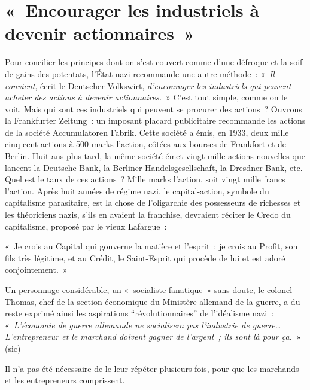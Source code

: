 \documentclass[french,twoside]{book} %
\newenvironment{quoteblock}%
  {\begin{quoting}}
  {\end{quoting}}
\newenvironment{quotebar}{%
    \def\FrameCommand{{\color{rubric!10!}\vrule width 0.5em} \hspace{0.9em}}%
    \def\OuterFrameSep{\itemsep} %
    \MakeFramed {\advance\hsize-\width \FrameRestore}
  }%
  {%
    \endMakeFramed
  }
\renewenvironment{quoteblock}%
  {%
    \savenotes
    \setstretch{0.9}
    \normalfont
    \begin{quotebar}
  }
  {%
    \end{quotebar}
    \spewnotes
  }
\begin{document}
\section[« Encourager les industriels à devenir actionnaires »]{« Encourager les industriels à devenir actionnaires »}
\noindent Pour concilier les principes dont on s’est couvert comme d’une défroque et la soif de gains des potentats, l’État nazi recommande une autre méthode : « \emph{Il convient}, écrit le Deutscher Volkswirt, \emph{d’encourager les industriels qui peuvent acheter des actions à devenir actionnaires.} » C’est tout simple, comme on le voit. Mais qui sont ces industriels qui peuvent se procurer des actions ? Ouvrons la Frankfurter Zeitung : un imposant placard publicitaire recommande les actions de la société Accumulatoren Fabrik. Cette société a émis, en 1933, deux mille cinq cent actions à 500 marks l’action, côtées aux bourses de Frankfort et de Berlin. Huit ans plus tard, la même société émet vingt mille actions nouvelles que lancent la Deutsche Bank, la Berliner Handelsgesellschaft, la Dresdner Bank, etc. Quel est le taux de ces actions ? Mille marks l’action, soit vingt mille francs l’action. Après huit années de régime nazi, le capital-action, symbole du capitalisme parasitaire, est la chose de l’oligarchie des possesseurs de richesses et les théoriciens nazis, s’ils en avaient la franchise, devraient réciter le Credo du capitalisme, proposé par le vieux Lafargue :\par

\begin{quoteblock}
 \noindent « Je crois au Capital qui gouverne la matière et l’esprit ; je crois au Profit, son fils très légitime, et au Crédit, le Saint-Esprit qui procède de lui et est adoré conjointement. »
 \end{quoteblock}

\noindent Un personnage considérable, un « socialiste fanatique » sans doute, le colonel Thomas, chef de la section économique du Ministère allemand de la guerre, a du reste exprimé ainsi les aspirations “révolutionnaires” de l’idéalisme nazi : « \emph{L’économie de guerre allemande ne socialisera pas l’industrie de guerre… L’entrepreneur et le marchand doivent gagner de l’argent ; ils sont là pour ça.} » (sic)\par
Il n’a pas été nécessaire de le leur répéter plusieurs fois, pour que les marchands et les entrepreneurs comprissent.
\end{document}
